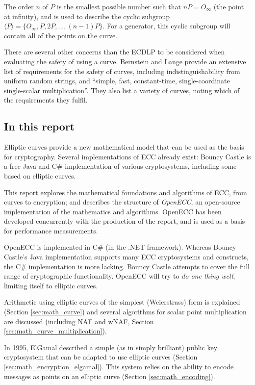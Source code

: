 The order \(n\) of \(P\) is the smallest possible number such that \(nP = O_{\infty}\) (the point at infinity), and is used to describe
the cyclic subgroup \(\langle P \rangle = \{ O_\infty, P, 2P, ..., (n-1)P \} \). For a generator, this cyclic subgroup
will contain all of the points on the curve.

There are several other concerns than the ECDLP to be considered when evaluating the safety of using a curve. Bernstein and Lange
provide an extensive list of requirements for the safety of curves, including indistinguishability from uniform random
strings, and ``simple, fast, constant-time, single-coordinate single-scalar multiplication''. They also list a variety
of curves, noting which of the requirements they fulfil.\cite{safecurves}

\subsection{In this report}

Elliptic curves provide a new mathematical model that can be used as the basis for cryptography. Several
implementations of ECC already exist: Bouncy Castle is a free Java and C\# implementation of various cryptosystems,
including some based on elliptic curves.\cite{bouncycastle}

This report explores the mathematical foundations and algorithms of ECC, from curves to encryption; and
describes the structure of \emph{OpenECC}, an open-source implementation of the mathematics and algorithms.
OpenECC has been developed concurrently with the production of the report, and is used as a basis for performance
measurements.

OpenECC is implemented in C\# (in the .NET framework). Whereas Bouncy Castle's Java implementation supports many
ECC cryptosystems and constructs, the C\# implementation is more lacking. Bouncy Castle attempts to cover the
full range of cryptographic functionality. OpenECC will try to \emph{do one thing well}, limiting itself to elliptic
curves.

Arithmetic using elliptic curves of the simplest (Weierstrass) form is explained (Section \ref{sec:math_curve}) and
several algorithms for scalar point multiplication are discussed (including NAF and wNAF, Section
\ref{sec:math_curve_multiplication}).

In 1995, ElGamal described a simple (as in simply brilliant) public key cryptosystem that can be adapted
to use elliptic curves (Section \ref{sec:math_encryption_elgamal}). This system relies on the ability to
encode messages as points on an elliptic curve (Section \ref{sec:math_encoding}).

